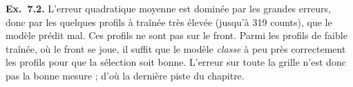 \textbf{Ex.~7.2.} L'erreur quadratique moyenne est dominée par les grandes erreurs, donc par les quelques profils à traînée très élevée (jusqu'à 319 counts), que le modèle prédit mal. Ces profils ne sont pas sur le front. Parmi les profils de faible traînée, où le front se joue, il suffit que le modèle \emph{classe} à peu près correctement les profils pour que la sélection soit bonne. L'erreur sur toute la grille n'est donc pas la bonne mesure ; d'où la dernière piste du chapitre.
